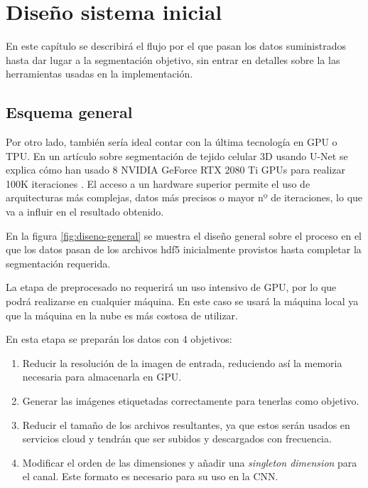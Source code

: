 \chapter{Diseño sistema inicial}\label{requisitos}

En este capítulo se describirá el flujo por el que pasan los datos suministrados hasta dar lugar a la segmentación objetivo, sin entrar en detalles sobre la las herramientas usadas en la implementación.

\section{Esquema general}\label{sec:diseno-general}

Por otro lado, también sería ideal contar con la última tecnología en GPU o TPU. En un artículo sobre segmentación de tejido celular 3D usando U-Net se explica cómo han usado 8 NVIDIA GeForce RTX 2080 Ti GPUs para realizar 100K iteraciones \cite{Wolny2020}. El acceso a un hardware superior permite el uso de arquitecturas más complejas, datos más precisos o mayor nº de iteraciones, lo que va a influir en el resultado obtenido.

\pagebreak {}

En la figura \ref{fig:diseno-general} se muestra el diseño general sobre el proceso en el que los datos pasan de los archivos hdf5 inicialmente provistos hasta completar la segmentación requerida.

La etapa de preprocesado no requerirá un uso intensivo de GPU, por lo que podrá realizarse en cualquier máquina. En este caso se usará la máquina local ya que la máquina en la nube es más costosa de utilizar.

En esta etapa se preparán los datos con 4 objetivos:
\begin{enumerate}
\item Reducir la resolución de la imagen de entrada, reduciendo así la memoria necesaria para almacenarla en GPU.
\item Generar las imágenes etiquetadas correctamente para tenerlas como objetivo.
\item Reducir el tamaño de los archivos resultantes, ya que estos serán usados en servicios cloud y tendrán que ser subidos y descargados con frecuencia.
\item Modificar el orden de las dimensiones y añadir una \textit{singleton dimension} para el canal. Este formato es necesario para su uso en la CNN.
\end{enumerate}

